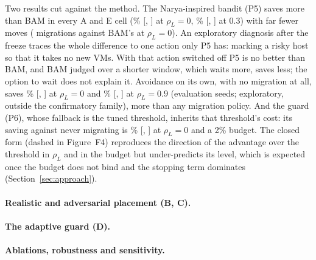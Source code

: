 Two results cut against the method. The Narya-inspired bandit (P5) saves more than BAM in every A
and E cell (\VSaveVsPZeroPFiveAOneTwo\% [\VSaveVsPZeroLoPFiveAOneTwo, \VSaveVsPZeroHiPFiveAOneTwo] at
$\rho_L = 0$, \VSaveVsPZeroPFiveAThreeTwo\% [\VSaveVsPZeroLoPFiveAThreeTwo,
\VSaveVsPZeroHiPFiveAThreeTwo] at $0.3$) with far fewer moves (\VMigrationsPFiveAOneTwo{}
migrations against BAM's \VMigrationsPFourAOneTwo{} at $\rho_L=0$). An exploratory diagnosis after
the freeze traces the whole difference to one action only P5 has: marking a risky host so that it
takes no new VMs. With that action switched off P5 is no better than BAM, and BAM judged over a
shorter window, which waits more, saves less; the option to wait does not explain it. Avoidance on
its own, with no migration at all, saves \VSaveAvoidPZeroAOneTwo\% [\VSaveAvoidLoPZeroAOneTwo,
\VSaveAvoidHiPZeroAOneTwo] at $\rho_L = 0$ and \VSaveAvoidPZeroASevenTwo\%
[\VSaveAvoidLoPZeroASevenTwo, \VSaveAvoidHiPZeroASevenTwo] at $\rho_L = 0.9$ (evaluation seeds;
exploratory, outside the confirmatory family), more than any migration policy. And the guard (P6),
whose fallback is the tuned threshold, inherits that threshold's cost: its saving against never
migrating is \VSaveVsPZeroPSixAOneTwo\% [\VSaveVsPZeroLoPSixAOneTwo, \VSaveVsPZeroHiPSixAOneTwo] at
$\rho_L=0$ and a 2\% budget. The closed form (dashed in Figure~F4)
reproduces the direction of the advantage over the threshold in $\rho_L$ and in the budget but
under-predicts its level, which is expected once the budget does not bind and the stopping term
dominates (Section~\ref{sec:approach}).

\paragraph{Realistic and adversarial placement (B, C).}

\paragraph{The adaptive guard (D).}

\paragraph{Ablations, robustness and sensitivity.}
